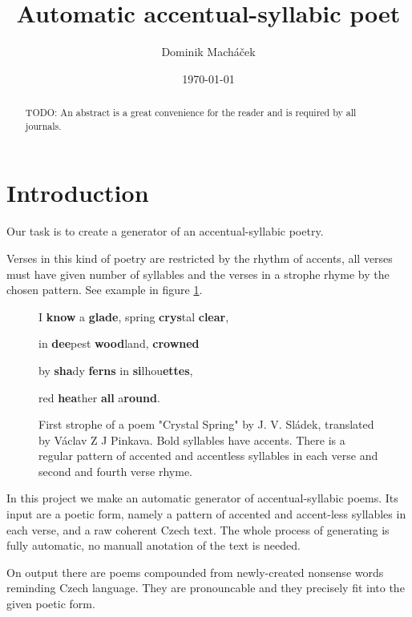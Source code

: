 \documentclass[a4]{article}
\begin{document}
\title{Automatic accentual-syllabic poet}

\author{Dominik Macháček}

\date{\today}

\maketitle

\begin{abstract}
TODO: An abstract is a great convenience for the reader and is required by all journals.
\end{abstract}


\section{Introduction}

Our task is to create a generator of an accentual-syllabic poetry.

Verses in this kind of poetry are restricted by the rhythm of accents, all
verses must have given number of syllables and the verses in a strophe
rhyme by the chosen pattern. See example in figure \ref{may}.

\begin{figure}[ht]
\label{may}
\centerline{
I {\bf know} a {\bf glade}, spring {\bf crys}tal {\bf clear},
}
\centerline{
in {\bf dee}pest {\bf wood}land, {\bf crowned}
}
\centerline{
by {\bf sha}dy {\bf ferns} in {\bf si}lhou{\bf ettes},
}
\centerline{
red {\bf hea}ther {\bf all} a{\bf round}.
}
\caption{First strophe of a poem "Crystal Spring" by J. V. Sládek, translated by
Václav Z J Pinkava. Bold syllables
have accents. There is a regular pattern of accented and accentless
syllables in each verse and second and fourth verse rhyme.}
\end{figure}



In this project we make an automatic generator of accentual-syllabic
poems. Its input are a poetic form, namely a pattern of accented and
accent-less syllables in each verse, and a raw coherent Czech text. The
whole process of generating is fully automatic, no manuall anotation of
the text is needed.

On output there are poems compounded from newly-created nonsense words
reminding Czech language. They are pronouncable and they precisely
fit into the given poetic form.
\end{document}
